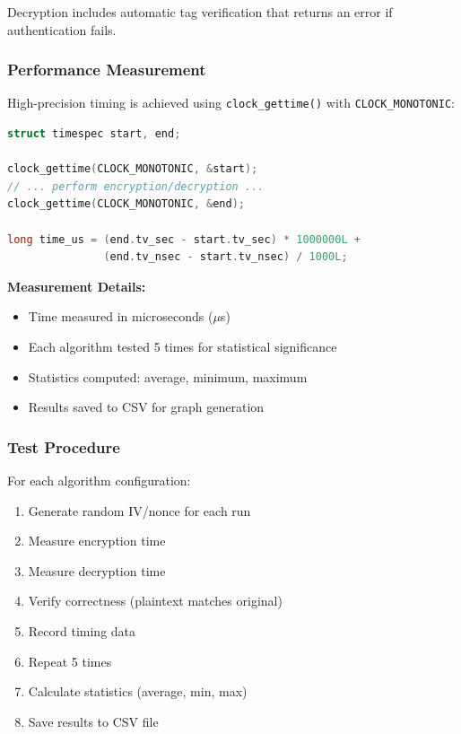 \documentclass[12pt,a4paper]{article}
\begin{document}
Decryption includes automatic tag verification that returns an error if authentication fails.

\subsubsection{Performance Measurement}
High-precision timing is achieved using \texttt{clock\_gettime()} with \texttt{CLOCK\_MONOTONIC}:

\begin{lstlisting}[language=C, caption=Performance measurement]
struct timespec start, end;

clock_gettime(CLOCK_MONOTONIC, &start);
// ... perform encryption/decryption ...
clock_gettime(CLOCK_MONOTONIC, &end);

long time_us = (end.tv_sec - start.tv_sec) * 1000000L + 
               (end.tv_nsec - start.tv_nsec) / 1000L;
\end{lstlisting}

\textbf{Measurement Details:}
\begin{itemize}
    \item Time measured in microseconds ($\mu$s)
    \item Each algorithm tested 5 times for statistical significance
    \item Statistics computed: average, minimum, maximum
    \item Results saved to CSV for graph generation
\end{itemize}

\subsubsection{Test Procedure}
For each algorithm configuration:
\begin{enumerate}
    \item Generate random IV/nonce for each run
    \item Measure encryption time
    \item Measure decryption time
    \item Verify correctness (plaintext matches original)
    \item Record timing data
    \item Repeat 5 times
    \item Calculate statistics (average, min, max)
    \item Save results to CSV file
\end{enumerate}

\newpage
\end{document}
